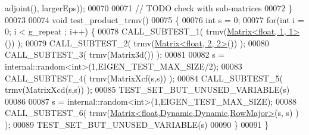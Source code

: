 \begin{DoxyCode}
      adjoint(), largerEps));
00070 
00071   \textcolor{comment}{// TODO check with sub-matrices}
00072 \}
00073 
00074 \textcolor{keywordtype}{void} test\_product\_trmv()
00075 \{
00076   \textcolor{keywordtype}{int} s = 0;
00077   \textcolor{keywordflow}{for}(\textcolor{keywordtype}{int} i = 0; i < g\_repeat ; i++) \{
00078     CALL\_SUBTEST\_1( trmv(\hyperlink{group___core___module_class_eigen_1_1_matrix}{Matrix<float, 1, 1>}()) );
00079     CALL\_SUBTEST\_2( trmv(\hyperlink{group___core___module_class_eigen_1_1_matrix}{Matrix<float, 2, 2>}()) );
00080     CALL\_SUBTEST\_3( trmv(Matrix3d()) );
00081     
00082     s = internal::random<int>(1,EIGEN\_TEST\_MAX\_SIZE/2);
00083     CALL\_SUBTEST\_4( trmv(MatrixXcf(s,s)) );
00084     CALL\_SUBTEST\_5( trmv(MatrixXcd(s,s)) );
00085     TEST\_SET\_BUT\_UNUSED\_VARIABLE(s)
00086     
00087     s = internal::random<int>(1,EIGEN\_TEST\_MAX\_SIZE);
00088     CALL\_SUBTEST\_6( trmv(\hyperlink{group___core___module_class_eigen_1_1_matrix}{Matrix<float,Dynamic,Dynamic,RowMajor>}(s, s)
      ) );
00089     TEST\_SET\_BUT\_UNUSED\_VARIABLE(s)
00090   \}
00091 \}
\end{DoxyCode}
